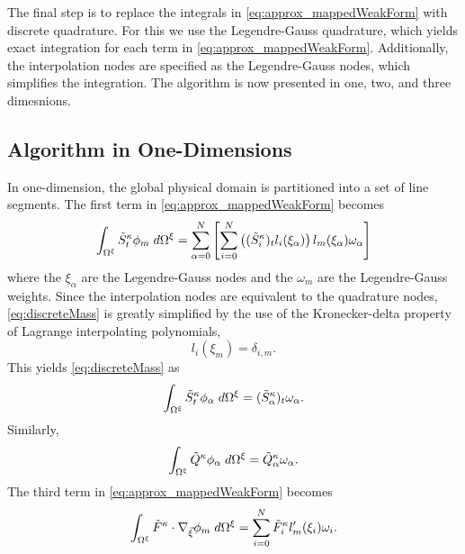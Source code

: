 \documentclass[12pt]{softwaremanual}
\begin{document}
The final step is to replace the integrals in \eqref{eq:approx_mappedWeakForm} with discrete quadrature. For this we use the Legendre-Gauss quadrature, which yields exact integration for each term in \eqref{eq:approx_mappedWeakForm}. Additionally, the interpolation nodes are specified as the Legendre-Gauss nodes, which simplifies the integration. The algorithm is now presented in one, two, and three dimesnions.

\subsection{Algorithm in One-Dimensions}\label{sec:DGSEM_1D}
In one-dimension, the global physical domain is partitioned into a set of line segments. The first term in \eqref{eq:approx_mappedWeakForm} becomes
\begin{equation}
\int_{\Omega^\xi} \tilde{S}^\kappa_t \phi_{m}  \hspace{1mm} d\Omega^\xi = \sum_{\alpha=0}^N\left[ \sum_{i=0}^N\left( (\tilde{S}^\kappa_{i})_tl_i(\xi_\alpha) \right)  l_m(\xi_\alpha) \omega_\alpha\right] \label{eq:discreteMass}
\end{equation}
where the $\xi_\alpha$ are the Legendre-Gauss nodes and the $\omega_m$ are the Legendre-Gauss weights. Since the interpolation nodes are equivalent to the quadrature nodes, \eqref{eq:discreteMass} is greatly simplified by the use of the Kronecker-delta property of Lagrange interpolating polynomials,
\begin{equation}
l_i(\xi_m) = \delta_{i,m}.
\end{equation}
This yields \eqref{eq:discreteMass} as
\begin{equation}
\int_{\Omega^\xi} \tilde{S}^\kappa_t \phi_{\alpha}  \hspace{1mm} d\Omega^\xi = (\tilde{S}^\kappa_{\alpha})_t \omega_\alpha.
\end{equation}
Similarly,
\begin{equation}
\int_{\Omega^\xi} \tilde{Q}^\kappa \phi_{\alpha}  \hspace{1mm} d\Omega^\xi = \tilde{Q}^\kappa_{\alpha} \omega_\alpha.
\end{equation}
The third term in \eqref{eq:approx_mappedWeakForm} becomes
\begin{equation}
\int_{\Omega^\xi} \tilde{F}^\kappa \cdot \nabla_{\vec{\xi}} \phi_{m}   \hspace{1mm} d\Omega^\xi = \sum_{i=0}^N  \tilde{F}^\kappa_i l'_m(\xi_i) \omega_i.
\end{equation}
\end{document}
